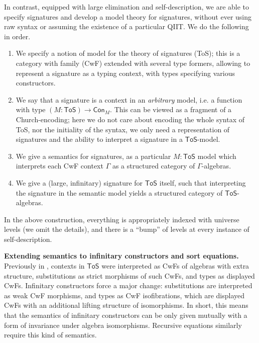 \documentclass{easychair}
\newcommand{\ToS}{\mathsf{ToS}}
\begin{document}
In contrast, equipped with large elimination and self-description, we are able
to specify signatures and develop a model theory for signatures, without ever
using raw syntax or assuming the existence of a particular QIIT. We do the
following in order.
\begin{enumerate}
  \item
  We specify a notion of model for the theory of signatures (ToS); this is a
  category with family (CwF) extended with several type formers, allowing to
  represent a signature as a typing context, with types specifying various
  constructors.
  \item We say that a signature is a context in an \emph{arbitrary} model, i.e.
  a function with type $(M : \mathsf{ToS})\to\mathsf{Con}_M$. This can be
  viewed as a fragment of a Church-encoding; here we do not care about
  encoding the whole syntax of ToS, nor the initiality of the syntax, we only
  need a representation of signatures and the ability to interpret a signature in
  a $\mathsf{ToS}$-model.
  \item We give a semantics for signatures, as a particular $M : \mathsf{ToS}$
    model which interprets each CwF context $\Gamma$ as a structured category of
    $\Gamma$-algebras.
  \item We give a (large, infinitary) signature for $\mathsf{ToS}$ itself, such
    that interpreting the signature in the semantic model yields a structured
    category of $\mathsf{ToS}$-algebras.
\end{enumerate}
In the above construction, everything is appropriately indexed with universe
levels (we omit the details), and there is a ``bump'' of levels at every
instance of self-description.

\textbf{Extending semantics to infinitary constructors and sort equations.}
Previously in \cite{kaposi2019constructing}, contexts in $\ToS$ were interpreted
as CwFs of algebras with extra structure, substitutions as strict morphisms of
such CwFs, and types as displayed CwFs. Infinitary constructors force a major
change: substitutions are interpreted as weak CwF morphisms, and types as CwF
isofibrations, which are displayed CwFs with an additional lifting structure of
isomorphisms. In short, this means that the semantics of infinitary constructors
can be only given mutually with a form of invariance under algebra
isomorphisms. Recursive equations similarly require this kind of semantics.
\end{document}

